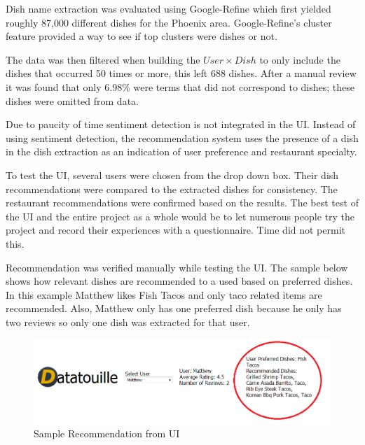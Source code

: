\documentclass[twoside,12pt]{article}
\begin{document}
Dish name extraction was evaluated using Google-Refine which first yielded roughly 87,000 different dishes for the Phoenix area. Google-Refine's cluster feature provided a way to see if top clusters were dishes or not. 
\newline

The data was then filtered when building the $User \times Dish$  to only include the dishes that occurred 50 times or more, this left 688 dishes. After a manual review it was found that only  6.98\%  were terms that did not correspond to dishes; these dishes were omitted from data. 
\newline

Due to paucity of time sentiment detection is not integrated in the UI. Instead of using sentiment detection, the recommendation system uses the presence of a dish in the dish extraction as an indication of user preference and restaurant specialty.
\newline

To test the UI, several users were chosen from the drop down box. Their dish recommendations were compared to the extracted dishes for consistency. The restaurant recommendations were confirmed based on the results. The best test of the UI and the entire project as a whole would be to let numerous people try the project and record their experiences with a questionnaire. Time did not permit this.
\newline

Recommendation was verified manually while testing the UI. The sample below shows how relevant dishes are recommended to a used based on preferred dishes. In this example Matthew likes Fish Tacos and only taco related items are recommended. Also, Matthew only has one preferred dish because he only has two reviews so only one dish was extracted for that user. 
\newline

\begin{figure}[ht]
	\includegraphics[width=\textwidth]{MatthewTacoRecomend.png}
    \caption{Sample Recommendation from UI}
\end{figure}
\end{document}
